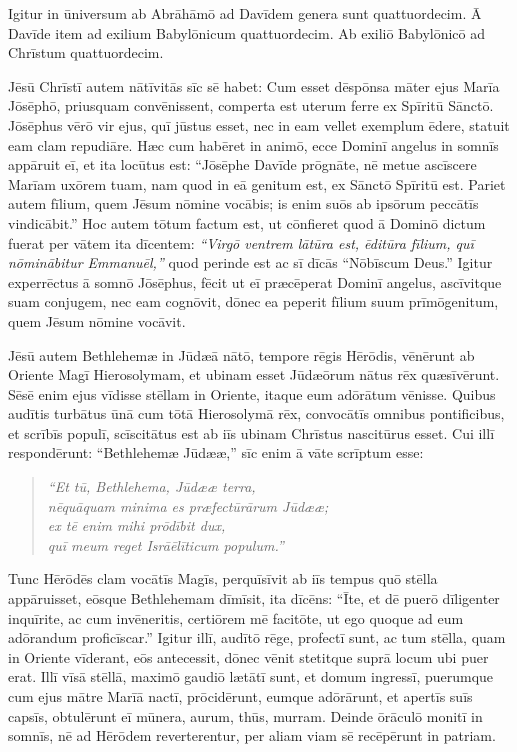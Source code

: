 \Versus Igitur in ūniversum ab Abrāhāmō ad Davīdem genera sunt quattuordecim. Ā Davīde item ad exilium Babylōnicum quattuordecim. Ab exiliō Babylōnicō ad Chrīstum quattuordecim.

\Versus Jēsū Chrīstī autem nātīvitās sīc sē habet: Cum esset dēspōnsa māter ejus Marīa Jōsēphō, priusquam convēnissent, comperta est uterum ferre ex Spīritū Sānctō. 
\Versus Jōsē\-phus vērō vir ejus, quī jūstus esset, nec in eam vellet exemplum ēdere, statuit eam clam repudiāre. 
\Versus Hæc cum habēret in animō, ecce Dominī angelus in somnīs appāruit eī, et ita locūtus est: ``Jōsēphe Davīde prōgnāte, nē metue ascīscere Marīam uxōrem tuam, nam quod in eā genitum est, ex Sānctō Spīritū est. 
\Versus Pariet autem fīlium, quem Jēsum nōmine vocābis; is enim suōs ab ipsōrum peccātīs vindicābit.'' 
\Versus Hoc autem tōtum factum est, ut cōnfieret quod ā Dominō dictum fuerat per vātem ita dīcentem: 
\Versus \emph{``Virgō ventrem lātūra est, ēditūra fīlium, quī nōminābitur Emmanuēl,''} quod perinde est ac sī dīcās ``Nōbīscum Deus.'' 
\Versus Igitur experrēctus ā somnō Jōsēphus, fēcit ut eī præcēperat Dominī angelus, ascīvitque suam conjugem, 
\Versus nec eam cognōvit, dōnec ea peperit fīlium suum prīmōgenitum, quem Jēsum nōmine vocāvit.
 

\Caput
\Versus Jēsū autem Bethlehemæ in Jūdæā nātō, tempore rēgis Hērōdis, vēnērunt ab Oriente Magī Hierosolymam, 
\Versus et ubinam esset Jūdæōrum nātus rēx quæsīvērunt. Sēsē enim ejus vīdisse stēllam in Oriente, itaque eum adōrātum vēnisse. 
\Versus Quibus audītis turbātus ūnā cum tōtā Hierosolymā rēx, 
\Versus convocātīs omnibus pontificibus, et scrībīs populī, scīscitātus est ab iīs ubinam Chrīstus nascitūrus esset. 
\Versus Cui illī respondērunt: ``Bethlehemæ Jūdææ,'' sīc enim ā vāte scrīptum esse:

\begin{verse}
\begin{patverse*}
\Versus \emph{``Et tū, Bethlehema, Jūdææ terra,\\
nēquāquam minima es præfectūrārum Jūdææ;\\
ex tē enim mihi prōdībit dux,\\
quī meum reget Isrāēlīticum populum.''}
\end{patverse*}
\end{verse}

\Versus Tunc Hērōdēs clam vocātīs Magīs, perquīsīvit ab iīs tempus quō stēlla appāruisset, 
\Versus eōsque Bethlehemam dīmīsit, ita dīcēns: ``Īte, et dē puerō dīligenter inquīrite, ac cum invēneritis, certiōrem mē facitōte, ut ego quoque ad eum adōrandum proficīscar.'' 
\Versus Igitur illī, audītō rēge, profectī sunt, ac tum stēlla, quam in Oriente vīderant, eōs antecessit, dōnec vēnit stetitque suprā locum ubi puer erat. 
\Versus Illī vīsā stēllā, maximō gaudiō lætātī sunt, 
\Versus et domum ingressī, puerumque cum ejus mātre Marīā nactī, prōcidērunt, eumque adōrārunt, et apertīs suīs capsīs, obtulērunt eī mūnera, aurum, thūs, murram. 
\Versus Deinde ōrāculō monitī in somnīs, nē ad Hērōdem reverterentur, per aliam viam sē recēpērunt in patriam.

